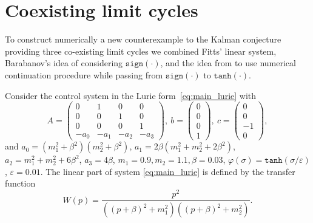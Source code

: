 \documentclass{ifacconf}
\theoremstyle{plain}
\begin{document}
\section{Coexisting limit cycles}

To construct numerically a new counterexample to the Kalman conjecture
providing three co-existing limit cycles
we combined Fitts' linear system,
Barabanov's idea of considering $\texttt{sign}(\cdot)$,
and the idea from \citep{LeonovK-2011-DAN} to use numerical continuation procedure
while passing from $\texttt{sign}(\cdot)$ to $\texttt{tanh}(\cdot)$.

Consider the control system in the Lurie form~\eqref{eq:main_lurie}
with
\begin{equation}\label{eq:main:matricies}
  A\!=\!\left(
  \begin{array}{cccc}
    0 & 1 & 0 & 0 \\
    0 & 0 & 1 & 0 \\
    0 & 0 & 0 & 1  \\
    -a_0 & -a_1 & -a_2 & -a_3
  \end{array}
  \right)\!\!, \
  b = \left(
    \begin{array}{c}
    0 \\ 0 \\ 0 \\ 1
    \end{array}
  \right)\!\!, \
  c = \left(
    \begin{array}{c}
    0 \\ 0 \\ -1 \\ 0
    \end{array}
  \right)\!\!,
\end{equation}
and $a_0 = (m_1^2+\beta^2)(m_2^2+\beta^2)$,
$a_1 = 2 \beta (m_1^2 + m_2^2 + 2 \beta^2)$,
$a_2 = m_1^2 + m_2^2 + 6 \beta^2$, $a_3 = 4 \beta$, $m_1 = 0.9, m_2 = 1.1,
\beta = 0.03$, $\varphi(\sigma) = \texttt{tanh}(\sigma / \varepsilon)$,
$\varepsilon = 0.01$.
The linear part of system \eqref{eq:main_lurie} is defined by the transfer function
\begin{equation}\label{eq:trFuncFitts}
  W(p) = \frac{p^2}{\left((p+\beta)^2 + m_1^2\right)\left((p+\beta)^2 + m_2^2\right)}.
\end{equation}
\end{document}
